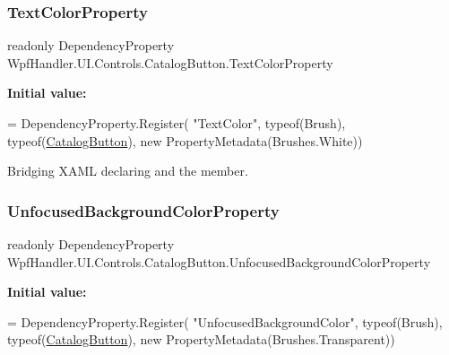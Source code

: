 \subsubsection{\texorpdfstring{Text\+Color\+Property}{TextColorProperty}}
{\footnotesize\ttfamily readonly Dependency\+Property Wpf\+Handler.\+U\+I.\+Controls.\+Catalog\+Button.\+Text\+Color\+Property\hspace{0.3cm}{\ttfamily [static]}}

{\bfseries Initial value\+:}
\begin{DoxyCode}
= DependencyProperty.Register(
          \textcolor{stringliteral}{"TextColor"}, typeof(Brush), typeof(\mbox{\hyperlink{class_wpf_handler_1_1_u_i_1_1_controls_1_1_catalog_button_a448a9b9dc299b55303d67f4e4b13c2d7}{CatalogButton}}),
          \textcolor{keyword}{new} PropertyMetadata(Brushes.White))
\end{DoxyCode}


Bridging X\+A\+ML declaring and the member. 

\mbox{\label{class_wpf_handler_1_1_u_i_1_1_controls_1_1_catalog_button_a607704571d71a9ca79f824962e860f3d}} 
\subsubsection{\texorpdfstring{Unfocused\+Background\+Color\+Property}{UnfocusedBackgroundColorProperty}}
{\footnotesize\ttfamily readonly Dependency\+Property Wpf\+Handler.\+U\+I.\+Controls.\+Catalog\+Button.\+Unfocused\+Background\+Color\+Property\hspace{0.3cm}{\ttfamily [static]}}

{\bfseries Initial value\+:}
\begin{DoxyCode}
= DependencyProperty.Register(
          \textcolor{stringliteral}{"UnfocusedBackgroundColor"}, typeof(Brush), typeof(\mbox{\hyperlink{class_wpf_handler_1_1_u_i_1_1_controls_1_1_catalog_button_a448a9b9dc299b55303d67f4e4b13c2d7}{CatalogButton}}),
          \textcolor{keyword}{new} PropertyMetadata(Brushes.Transparent))
\end{DoxyCode}



